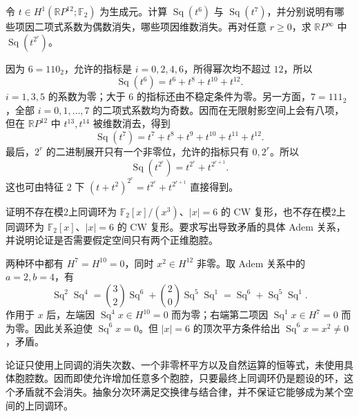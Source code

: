 \begin{exercise}\label{g2:ex:projective-square-binary-calculation}
	令 \(t\in H^1(\mathbb RP^{12};\mathbb F_2)\) 为生成元。计算 \(\operatorname{Sq}(t^6)\) 与 \(\operatorname{Sq}(t^7)\)，并分别说明有哪些项因二项式系数为偶数消失，哪些项因维数消失。再对任意 \(r\ge0\)，求 \(\mathbb RP^\infty\) 中 \(\operatorname{Sq}(t^{2^r})\)。
\end{exercise}
\begin{solution}
	因为 \(6=110_2\)，允许的指标是 \(i=0,2,4,6\)，所得幂次均不超过 \(12\)，所以
	\[
		\operatorname{Sq}(t^6)=t^6+t^8+t^{10}+t^{12}.
	\]
	\(i=1,3,5\) 的系数为零；大于 \(6\) 的指标还由不稳定条件为零。另一方面，\(7=111_2\)，全部 \(i=0,1,\ldots,7\) 的二项式系数均为奇数。因而在无限射影空间上会有八项，但在 \(\mathbb RP^{12}\) 中 \(t^{13},t^{14}\) 被维数消去，得到
	\[
		\operatorname{Sq}(t^7)=t^7+t^8+t^9+t^{10}+t^{11}+t^{12}.
	\]
	最后，\(2^r\) 的二进制展开只有一个非零位，允许的指标只有 \(0,2^r\)。所以
	\[
		\operatorname{Sq}(t^{2^r})=t^{2^r}+t^{2^{r+1}}.
	\]
	这也可由特征 \(2\) 下 \((t+t^2)^{2^r}=t^{2^r}+t^{2^{r+1}}\) 直接得到。
\end{solution}

\begin{exercise}\label{g2:ex:unrealizable-degree-six-polynomial}
	证明不存在模2上同调环为 \(\mathbb F_2[x]/(x^3)\)、\(|x|=6\) 的 CW 复形，也不存在模2上同调环为 \(\mathbb F_2[x]\)、\(|x|=6\) 的 CW 复形。要求写出导致矛盾的具体 Adem 关系，并说明论证是否需要假定空间只有两个正维胞腔。
\end{exercise}
\begin{solution}
	两种环中都有 \(H^7=H^{10}=0\)，同时 \(x^2\in H^{12}\) 非零。取 Adem 关系中的 \(a=2,b=4\)，有
	\[
		\operatorname{Sq}^2\operatorname{Sq}^4
		=\binom32\operatorname{Sq}^6+\binom20\operatorname{Sq}^5\operatorname{Sq}^1
		=\operatorname{Sq}^6+\operatorname{Sq}^5\operatorname{Sq}^1.
	\]
	作用于 \(x\) 后，左端因 \(\operatorname{Sq}^4x\in H^{10}=0\) 而为零；右端第二项因 \(\operatorname{Sq}^1x\in H^7=0\) 而为零。因此关系迫使 \(\operatorname{Sq}^6x=0\)。但 \(|x|=6\) 的顶次平方条件给出 \(\operatorname{Sq}^6x=x^2\ne0\)，矛盾。

	论证只使用上同调的消失次数、一个非零杯平方以及自然运算的恒等式，未使用具体胞腔数。因而即使允许增加任意多个胞腔，只要最终上同调环仍是题设的环，这个矛盾就不会消失。抽象分次环满足交换律与结合律，并不保证它能够成为某个空间的上同调环。
\end{solution}

